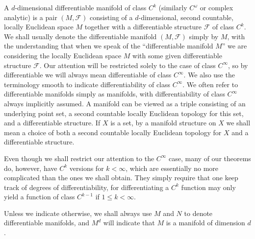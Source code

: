 A $d$-dimensional differentiable manifold of class $C^{k}$ (similarly $C^{\omega}$ or complex
analytic) is a pair $(M,\mathcal{F})$ consisting of a $d$-dimensional, second countable,
locally Euclidean space $M$ together with a differentiable structure $\mathcal{F}$
of class $C^{k}$. We shall usually denote the differentiable manifold $(M,\mathcal{F})$
simply by $M$, with the understanding that when we speak of the “differentiable
manifold $M$” we are considering the locally Euclidean space $M$ with some given
differentiable structure $\mathcal{F}$. Our attention will be restricted
solely to the case of class $C^{\infty}$, so by differentiable we will
always mean differentiable of class $C^{\infty}$. We also use the
terminology smooth to indicate differentiability of class $C^{\infty}$.
We often refer to differentiable manifolds simply as manifolds, with
differentiability of class $C^{\infty}$ always implicitly assumed.
A manifold can be viewed as a triple consisting of an underlying
point set, a second countable locally Euclidean topology for this set,
and a differentiable structure. If $X$ is a set, by a manifold structure
on $X$ we shall mean a choice of both a second countable locally
Euclidean topology for $X$ and a differentiable structure.

Even though we shall restrict our attention to the $C^\infty$ case, many of
our theorems do, however, have $C^k$ versions for $k < \infty$, which
are essentially no more complicated than the ones we shall obtain.
They simply require that one keep track of degrees of differentiability,
for differentiating a $C^k$ function may only yield a function of class
$C^{k-1}$ if $1 \leq k < \infty$.

Unless we indicate otherwise, we shall always use $M$ and $N$ to denote
differentiable manifolds, and  $ M^{d} $ will indicate that $M$ is
a manifold of dimension $d$.


